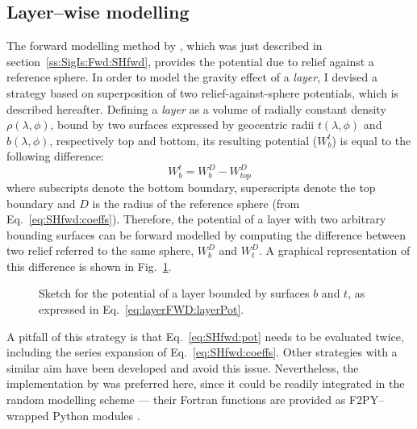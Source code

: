 
\subsection{Layer--wise modelling}
\label{ss:SigIs:Fwd:LayerFwd}
The forward modelling method by \Textcite{Wieczorek2007}, which was just described in section~\ref{ss:SigIs:Fwd:SHfwd}, provides the potential due to relief against a reference sphere.
In order to model the gravity effect of a \textit{layer}, I devised a strategy based on superposition of two relief-against-sphere potentials, which is described hereafter.
Defining a \textit{layer} as a volume of radially constant density $\rho(\lambda, \phi)$, bound by two surfaces expressed by geocentric radii $t(\lambda, \phi)$ and $b(\lambda, \phi)$, respectively top and bottom, its resulting potential ($W_{b}^{t}$) is equal to the following difference:
\begin{equation}
    \label{eq:layerFWD:layerPot}
    W_{b}^{t} = W_{b}^{D} - W_{top}^{D}
\end{equation}
where subscripts denote the bottom boundary, superscripts denote the top boundary and $D$ is the radius of the reference sphere (from Eq.~\ref{eq:SHfwd:coeffs}).
Therefore, the potential of a layer with two arbitrary bounding surfaces can be forward modelled by computing the difference between two relief referred to the same sphere, $W_{b}^{D}$ and $W_{t}^{D}$.
A graphical representation of this difference is shown in Fig.~\ref{fig:SigIs:LayerDifference}.

\begin{figure}
    \begin{adjustbox}{center}
    \end{adjustbox}
    \caption[Sketch for the potential of a layer.]{Sketch for the potential of a layer bounded by surfaces $b$ and $t$, as expressed in Eq.~\ref{eq:layerFWD:layerPot}.}
    \label{fig:SigIs:LayerDifference}
\end{figure}

A pitfall of this strategy is that Eq.~\ref{eq:SHfwd:pot} needs to be evaluated twice, including the series expansion of Eq.~\ref{eq:SHfwd:coeffs}.
Other strategies with a similar aim have been developed \parencite[e.g.][]{Novak2006} and avoid this issue.
Nevertheless, the implementation by \textcite{Wieczorek2018} was preferred here, since it could be readily integrated in the random modelling scheme --- their Fortran functions are provided as {F2PY}--wrapped Python modules \parencite{Peterson2009}.

